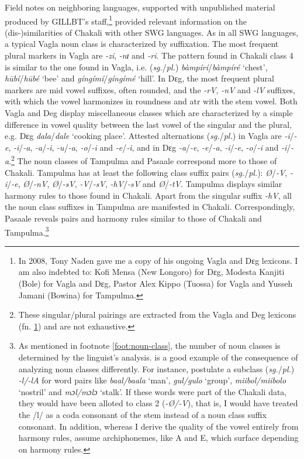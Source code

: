 \begin{exe}
\begin{exe}
\begin{exe}
{\begin{exe}
\begin{exe}
\begin{exe}
\begin{exe}
Field notes on neighboring languages, supported with unpublished
material produced
by GILLBT's staff,\footnote{\label{ft:GRM-naden-donate}In 2008, Tony Naden gave
me  a copy of his ongoing
Vagla and Dɛg lexicons. I am also 
indebted to: Kofi Mensa (New
Longoro) for Dɛg, Modesta
Kanjiti  (Bole) for Vagla and Dɛg, Pastor Alex Kippo (Tuossa) for Vagla and 
Yusseh Jamani (Bowina) for Tampulma.}  provided relevant information on
the
(dis-)similarities of Chakali with other SWG languages. As in all SWG languages,
a typical Vagla noun class is characterized by  suffixation.
The most frequent plural markers in Vagla are {\it -zi}, {\it -nɪ} and
{\it -ri}. The pattern found in Chakali  class 4 is similar to the one found in
Vagla, i.e.
({\it sg.}/{\it pl.}) {\it bàmpírí}/{\it bàmpíré} `chest',  {\it 
hūbí}/{\it hūbé}  `bee' and   {\it gíngímí}/{\it gíngímé} `hill'.  In 
Dɛg,   the most
frequent plural markers are mid vowel suffixes, often rounded,  and
the {\it -rV}, {\it -nV} and  {\it -lV} suffixes, with which the vowel 
harmonizes
in
roundness and {\sc atr} with the stem vowel. Both Vagla and Deg display 
miscellaneous classes which are characterized by  a simple difference
in vowel quality between the last vowel of the singular and the plural, e.g. Dɛg
{\it dala}/{\it dale} `cooking place'. Attested
alternations  ({\it sg.}/{\it pl.}) in Vagla are {\it -i}/{\it -e},  {\it 
-i}/{\it -a},  {\it -a}/{\it -i}, 
{\it -u}/{\it -a},  {\it -o}/{\it -i} and  {\it -e}/{\it -i},   and in Dɛg {\it 
-a}/{\it -e}, {\it -e}/{\it -a}, {\it -i}/{\it -e}, {\it -o}/{\it -i} and  {\it 
-i}/{\it -a}.\footnote{These singular/plural pairings are extracted from the 
Vagla and
Deg lexicons (fn. \ref{ft:GRM-naden-donate}) and are not exhaustive.}  The noun
classes of Tampulma and Pasaale
correspond more to those of Chakali. Tampulma has at least
the
following class suffix pairs ({\it sg.}/{\it pl.}): {\it \O}/{\it -V}, {\it 
-i}/{\it -e}, {\it \O}/{\it -nV},  {\it  \O}/{\it -sV}, {\it  -V}/{\it -sV},  
{\it -hV}/{\it -sV} and  
{\it \O}/{\it -tV}.
Tampulma displays similar harmony rules to those found in Chakali. Apart from
the singular suffix {\it -hV}, all the noun class suffixes in Tampulma are
manifested in Chakali.  Correspondingly, Pasaale reveals  pairs and
harmony rules similar to those of Chakali and Tampulma.\footnote{As mentioned in
footnote
\ref{foot:noun-class}, the number of noun classes is determined by the
linguist's analysis.  \citet[5--12]{Mcgi99} is a good example of 
the consequence of analyzing noun classes differently. For instance,  
 \citet[7]{Mcgi99} postulate a subclass  ({\it sg.}/{\it pl.})  {\it -l/-lA} 
for 
word pairs like {\it baal/baala} `man', {\it gul/gulo} `group', 
{\it miibol/miibolo} `nostril' and  {\it mɔl/mɔlɔ} `stalk'. If these words were 
part
of the
Chakali data, they would have been alloted to class 2 ({\it -\O/-V}), that is,
I would have treated the /l/ as a coda consonant of the stem instead of a noun
class
suffix consonant. In addition, whereas I derive the quality of the vowel
entirely from harmony rules,  \citeauthor{Mcgi99} assume archiphonemes, like A
and E, which surface depending on harmony rules.}


\end{exe}
\end{exe}
\end{exe}
\end{exe}}
\end{exe}
\end{exe}
\end{exe}

